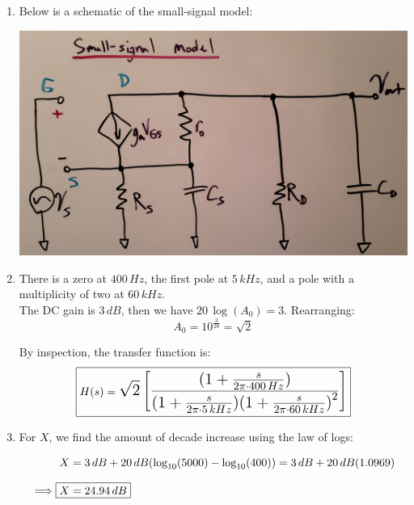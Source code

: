 \documentclass[12pt, fleqn]{article}
\begin{document}
\begin{enumerate}[label=(\alph*)]
    \item
    {
    Below is a schematic of the small-signal model:

    \includegraphics[scale=0.08, center]{p2ss.jpg}\\
    }
    \item
    {
    There is a zero at $400\,Hz$, the first pole at $5\,kHz$, and a pole with a multiplicity of two at $60\,kHz$.\\[0.5cm]
    
    The DC gain is $3\,dB$, then we have $20\,\log(A_0) = 3$.  Rearranging:
    \begin{equation}
        A_0 = 10^{\frac{3}{20}} = \sqrt{2}
    \end{equation}
    
    By inspection, the transfer function is:
    \begin{equation}
        \boxed{H(s) = \mathlarger{\mathlarger{\sqrt{2} \left[\frac{(1 + \frac{s}{2\pi \cdot 400\,Hz})}{(1 + \frac{s}{2\pi \cdot 5\,kHz}){(1 + \frac{s}{2\pi \cdot 60\,kHz})}^2}\right]}}}
    \end{equation}
    }
    \item
    {
    For $X$, we find the amount of decade increase using the law of logs:
    
    \begin{align*}
        X &= 3\,dB + 20\,dB(\log_{10}(5000) - \log_{10}(400)) = 3\,dB + 20\,dB(1.0969)\\[0.25cm]
        \implies \Aboxed{X &= 24.94\,dB}
    \end{align*}
    
}
\end{enumerate}
\end{document}
